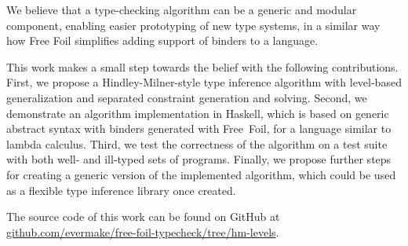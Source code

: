 We believe that a type-checking algorithm can be a generic and modular component, enabling easier prototyping of new type systems, in a similar way how Free Foil simplifies adding support of binders to a language.

This work makes a small step towards the belief with the following contributions. First, we propose a Hindley-Milner-style type inference algorithm with level-based generalization and separated constraint generation and solving. Second, we demonstrate an algorithm implementation in Haskell, which is based on generic abstract syntax with binders generated with Free~Foil, for a language similar to lambda calculus. Third, we test the correctness of the algorithm on a test suite with both well- and ill-typed sets of programs. Finally, we propose further steps for creating a generic version of the implemented algorithm, which could be used as a flexible type inference library once created.

The source code of this work can be found on GitHub at \href{https://github.com/evermake/free-foil-typecheck/tree/hm-levels}{github.com\slash evermake\slash free-foil-typecheck\slash tree\slash hm-levels}.
